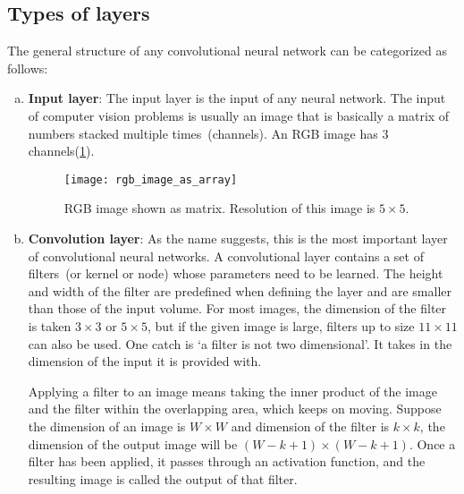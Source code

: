 \subsection{Types of layers}
\label{subsection:types_of_layers}
The general structure of any convolutional neural network can be categorized as follows:
\begin{enumerate}[(a)]
    \item \textbf{Input layer}:
        The input layer is the input of any neural network. The input of computer vision problems is usually an image that is basically a matrix of numbers stacked multiple times~(channels). An RGB image has 3 channels(\cref{fig:RGB_image}).
        \begin{figure}[h!]
            \centering
            \texttt{[image: rgb\_image\_as\_array]}
            \caption[RGB image shown as matrix]{RGB image shown as matrix. Resolution of this image is $5\times5$.}
            \label{fig:RGB_image}
        \end{figure}
        
    \item \textbf{Convolution layer}:
        As the name suggests, this is the most important layer of convolutional neural networks. A convolutional layer contains a set of filters~(or kernel or node) whose parameters need to be learned. The height and width of the filter are predefined when defining the layer and are smaller than those of the input volume. For most images, the dimension of the filter is taken $3\times3$ or $5\times5$, but if the given image is large, filters up to size $11\times11$ can also be used. One catch is `a filter is not two dimensional'. It takes in the dimension of the input it is provided with.

        Applying a filter to an image means taking the inner product of the image and the filter within the overlapping area, which keeps on moving. Suppose the dimension of an image is $W\times W$ and dimension of the filter is $k\times k$, the dimension of the output image will be $(W-k+1)\times (W-k+1)$. Once a filter has been applied, it passes through an activation function, and the resulting image is called the output of that filter.
    

\end{enumerate}
